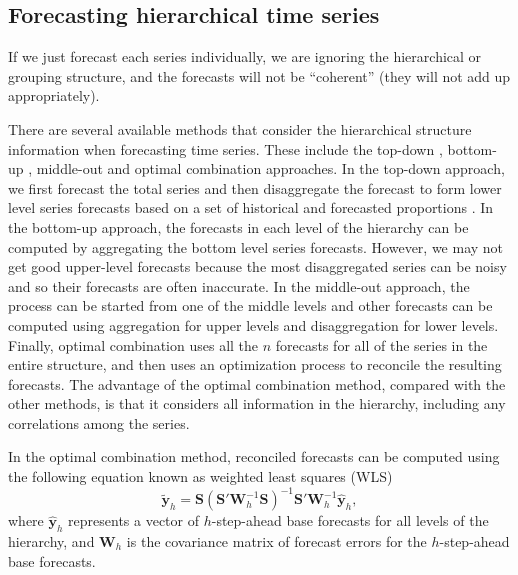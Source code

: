 \documentclass[11pt,a4paper,]{article}
\begin{document}
\hypertarget{forecasting-hierarchical-time-series}{%
\subsection{Forecasting hierarchical time
series}\label{forecasting-hierarchical-time-series}}

If we just forecast each series individually, we are ignoring the
hierarchical or grouping structure, and the forecasts will not be
``coherent'' (they will not add up appropriately).

There are several available methods that consider the hierarchical
structure information when forecasting time series. These include the
top-down \autocite{gross1990disaggregation,fliedner2001hierarchical},
bottom-up \autocite{kahn1998revisiting}, middle-out and optimal
combination \autocite{hyndman2011optimal} approaches. In the top-down
approach, we first forecast the total series and then disaggregate the
forecast to form lower level series forecasts based on a set of
historical and forecasted proportions \autocite[for details
see][]{athanasopoulos2009hierarchical}. In the bottom-up approach, the
forecasts in each level of the hierarchy can be computed by aggregating
the bottom level series forecasts. However, we may not get good
upper-level forecasts because the most disaggregated series can be noisy
and so their forecasts are often inaccurate. In the middle-out approach,
the process can be started from one of the middle levels and other
forecasts can be computed using aggregation for upper levels and
disaggregation for lower levels. Finally, optimal combination uses all
the \(n\) forecasts for all of the series in the entire structure, and
then uses an optimization process to reconcile the resulting forecasts.
The advantage of the optimal combination method, compared with the other
methods, is that it considers all information in the hierarchy,
including any correlations among the series.

In the optimal combination method, reconciled forecasts can be computed
using the following equation known as weighted least squares (WLS)
\autocite{mint2018} \begin{equation}\label{eq:mint}
  \tilde{\bm{y}}_{h}=\bm{S}(\bm{S}'\bm{W}_h^{-1}\bm{S})^{-1}\bm{S}'\bm{W}_h^{-1}\hat{\bm{y}}_h,
\end{equation} where \(\hat{\bm{y}}_h\) represents a vector of
\(h\)-step-ahead base forecasts for all levels of the hierarchy, and
\(\bm{W}_h\) is the covariance matrix of forecast errors for the
\(h\)-step-ahead base forecasts.
\end{document}
